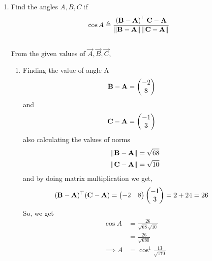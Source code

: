 \documentclass[11pt]{book}
\begin{document}
\begin{enumerate}[label=\thesection.\arabic*.,ref=\thesection.\theenumi]
\item Find the angles $A, B, C$ if 
    \label{prop:angle2d}
  \begin{align}
    \label{eq:angle2d}
   \cos A \triangleq 
\frac{\brak{\vec{B}-\vec{A}}^{\top}{\vec{C}-\vec{A}}}{\norm{\vec{B}-\vec{A}}\norm{\vec{C}-\vec{A}}}
  \end{align}
\solution\\
From the given values of $\vec{A},\vec{B},\vec{C}$,\\
\begin{enumerate}
 \item Finding the value of angle A
\begin{align}
 \mathbf{B}-\mathbf{A} &=\begin{pmatrix}-2\\8\end{pmatrix}
\end{align}
and 
\begin{align}
 \mathbf{C}-\mathbf{A} &= \begin{pmatrix}-1\\3\end{pmatrix}
\end{align}
also calculating the values of norms
\begin{align}
 \left\lVert\mathbf{B}-\mathbf{A}\right\rVert &= \sqrt{68}\\
 \left\lVert\mathbf{C}-\mathbf{A}\right\rVert &= \sqrt{10}
\end{align}
and by doing matrix multiplication we get,
\begin{align}
\begin{split}
 (\mathbf{B}-\mathbf{A})^{\top}(\mathbf{C}-\mathbf{A}) &= \begin{pmatrix}-2&8\end{pmatrix}\begin{pmatrix}-1\\3\end{pmatrix} = 2 + 24 =26
\end{split}
\end{align}
So, we get
\begin{align}
 \cos{A} &= \frac{26}{\sqrt{68} \sqrt{10}}\\
 &= \frac{26}{\sqrt{680}}\\
 \implies A& = \cos^{1}{\frac{13}{\sqrt{170}}}
\end{align}


\end{enumerate}
\end{enumerate}
\end{document}
